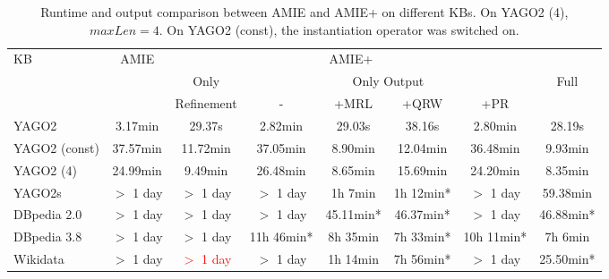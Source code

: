 \begin{center}
\begin{savenotes}
\begin{table}[t]
\centering
\footnotesize
\begin{tabular}{|l|c|c|c|c|c|c|c|}
\hline
\multirow{3}{*}{KB} 	& \multirow{3}{*}{AMIE}  	& \multicolumn{5}{c}{AMIE+} 	\\ \cline{3-8}
 			& 				& Only				& \multicolumn{4}{c|}{Only Output}   										& \multirow{2}{*}{Full}  \\ \cline{4-7}
			&  				& Refinement			&   -				& +MRL     			&+QRW 		&+PR				& 	   	   	\\ \hline
  YAGO2  		& 3.17min  			&29.37s				& 2.82min  			& 29.03s  	 		&38.16s 	&2.80min  			& 28.19s	   	\\ \hline
  YAGO2 (const)  	& 37.57min  			&11.72min			& 37.05min 			& 8.90min  			&12.04min 	&36.48min  			& 9.93min	   	\\ \hline  
  YAGO2 (4)  		& 24.99min  			&9.49min			& 26.48min 			& 8.65min  			&15.69min 	&24.20min  			& 8.35min 	   	\\ \hline
  YAGO2s  		& $>$ 1 day  			&$>$ 1 day			&$>$ 1 day 			& 1h 7min  		    	&1h 12min*	&$>$ 1 day  			& 59.38min	   	\\ \hline
  DBpedia 2.0  		& $>$ 1 day  			&$>$ 1 day			&$>$ 1 day 			& 45.11min*  		    	&46.37min*      &$>$ 1 day  			& 46.88min*	   	\\ \hline
  DBpedia 3.8  		& $>$ 1 day  			&$>$ 1 day			&11h 46min*			& 8h 35min 			&7h 33min*	&10h 11min*  			& 7h 6min 	   	\\ \hline
  Wikidata  		& $>$ 1 day  			&\textcolor{red}{$>$ 1 day}	&$>$ 1 day 			& 1h 14min 			&7h 56min*	&$>$ 1 day	  		& 25.50min*	   	\\ \hline
\end{tabular}
\caption{Runtime and output comparison between AMIE and AMIE+ on different KBs. On YAGO2 (4), $maxLen=4$. On YAGO2 (const), the instantiation operator was switched on.}
\label{amievsplus}
\end{table}
\end{savenotes}
\end{center}


